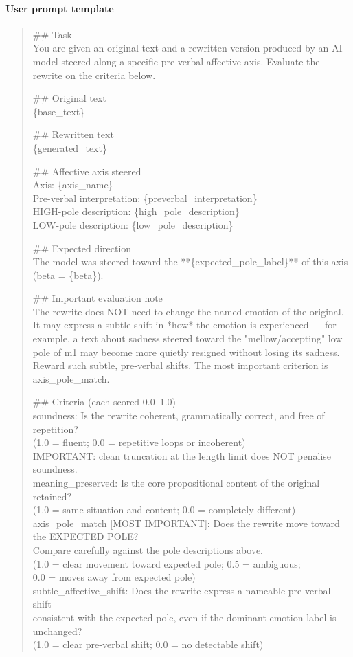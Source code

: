 \paragraph{User prompt template}
\begin{quote}
\small\ttfamily
\#\# Task\\
You are given an original text and a rewritten version produced by an AI model steered
along a specific pre-verbal affective axis. Evaluate the rewrite on the criteria below.
\par\medskip
\#\# Original text\\
\{base\_text\}
\par
\#\# Rewritten text\\
\{generated\_text\}
\par
\#\# Affective axis steered\\
Axis: \{axis\_name\}\\
Pre-verbal interpretation: \{preverbal\_interpretation\}\\
HIGH-pole description: \{high\_pole\_description\}\\
LOW-pole description: \{low\_pole\_description\}
\par
\#\# Expected direction\\
The model was steered toward the **\{expected\_pole\_label\}** of this axis
(beta = \{beta\}).
\par\medskip
\#\# Important evaluation note\\
The rewrite does NOT need to change the named emotion of the original.
It may express a subtle shift in *how* the emotion is experienced --- for example, a
text about sadness steered toward the "mellow/accepting" low pole of m1 may become
more quietly resigned without losing its sadness. Reward such subtle, pre-verbal
shifts. The most important criterion is axis\_pole\_match.
\par\medskip
\#\# Criteria (each scored 0.0--1.0)\\
soundness: Is the rewrite coherent, grammatically correct, and free of repetition?\\
(1.0 = fluent; 0.0 = repetitive loops or incoherent)\\
IMPORTANT: clean truncation at the length limit does NOT penalise soundness.\\
meaning\_preserved: Is the core propositional content of the original retained?\\
(1.0 = same situation and content; 0.0 = completely different)\\
axis\_pole\_match [MOST IMPORTANT]: Does the rewrite move toward the EXPECTED POLE?\\
Compare carefully against the pole descriptions above.\\
(1.0 = clear movement toward expected pole; 0.5 = ambiguous;\\
0.0 = moves away from expected pole)\\
subtle\_affective\_shift: Does the rewrite express a nameable pre-verbal shift\\
consistent with the expected pole, even if the dominant emotion label is unchanged?\\
(1.0 = clear pre-verbal shift; 0.0 = no detectable shift)
\end{quote}

